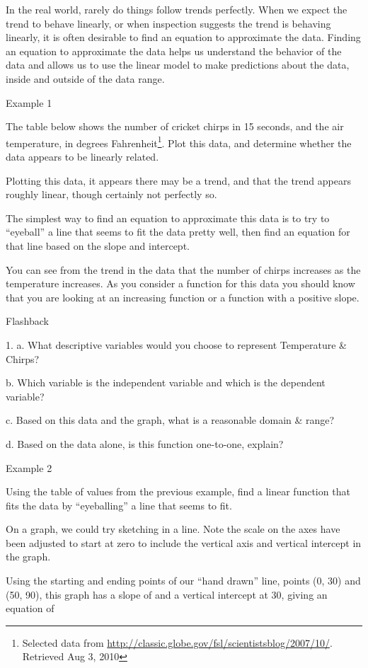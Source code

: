 \begin{enumerate}
In the real world, rarely do things follow trends perfectly. When we
expect the trend to behave linearly, or when inspection suggests the
trend is behaving linearly, it is often desirable to find an equation to
approximate the data. Finding an equation to approximate the data helps
us understand the behavior of the data and allows us to use the linear
model to make predictions about the data, inside and outside of the data
range.

Example 1

The table below shows the number of cricket chirps in 15 seconds, and
the air temperature, in degrees Fahrenheit\footnote{Selected data from
  \url{http://classic.globe.gov/fsl/scientistsblog/2007/10/}. Retrieved
  Aug 3, 2010}. Plot this data, and determine whether the data appears
to be linearly related.

Plotting this data, it appears there may be a trend, and that the trend
appears roughly linear, though certainly not perfectly so.

The simplest way to find an equation to approximate this data is to try
to ``eyeball'' a line that seems to fit the data pretty well, then find
an equation for that line based on the slope and intercept.

You can see from the trend in the data that the number of chirps
increases as the temperature increases. As you consider a function for
this data you should know that you are looking at an increasing function
or a function with a positive slope.

Flashback

1. a. What descriptive variables would you choose to represent
Temperature \& Chirps?

b. Which variable is the independent variable and which is the dependent
variable?

c. Based on this data and the graph, what is a reasonable domain \&
range?

d. Based on the data alone, is this function one-to-one, explain?

Example 2

Using the table of values from the previous example, find a linear
function that fits the data by ``eyeballing'' a line that seems to fit.

On a graph, we could try sketching in a line. Note the scale on the axes
have been adjusted to start at zero to include the vertical axis and
vertical intercept in the graph.

Using the starting and ending points of our ``hand drawn'' line, points
(0, 30) and (50, 90), this graph has a slope of and a vertical intercept
at 30, giving an equation of


\end{enumerate}
